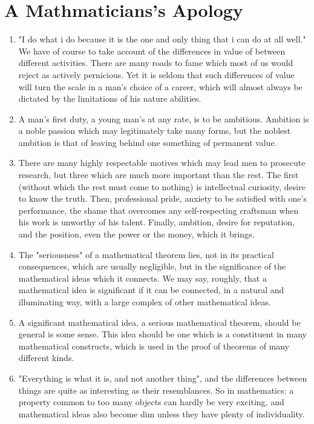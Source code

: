 \documentclass[UTF8]{ctexart}
\begin{document}
		\newpage
		
	\section{A Mathmaticians's Apology}
		
		\begin{enumerate}
			\item "I do what i do because it is the one and only thing that i can do at all well." We have of course to take account of the differences in value of between different activities. There are many roads to fame which most of us would reject as actively pernicious. Yet it is seldom that such differences of value will turn the scale in a man's choice of a career, which will almost always be dictated by the limitations of his nature abilities.
			\item A man's first duty, a young man's at any rate, is to be ambitious. Ambition is a noble passion which may legitimately take many forms, but the noblest ambition is that of leaving behind one something of permanent value.
			\item There are many highly respectable motives which may lead men to prosecute research, but three which are much more important than the rest. The first (without which the rest must come to nothing) is intellectual curiosity, desire to know the truth. Then, professional pride, anxiety to be satisfied with one's performance, the shame that overcomes any self-respecting craftsman when his work is unworthy of his talent. Finally, ambition, desire for reputation, and the position, even the power or the money, which it brings.
			\item The "seriousness" of a mathematical theorem lies, not in its practical consequences, which are usually negligible, but in the significance of the mathematical ideas which it connects. We may say, roughly, that a mathematical idea is significant if it can be connected, in a natural and illuminating way, with a large complex of other mathematical ideas.
			\item A significant mathematical idea, a serious mathematical theorem, should be general is some sense. This idea should be one which is a constituent in many mathematical constructs, which is used in the proof of theorems of many different kinds.
			\item "Everything is what it is, and not another thing", and the differences between things are quite as interesting as their resemblances. So in mathematics: a property common to too many objects can hardly be very exciting, and mathematical ideas also become dim unless they have plenty of individuality. 
		\end{enumerate}
	
\end{document}
